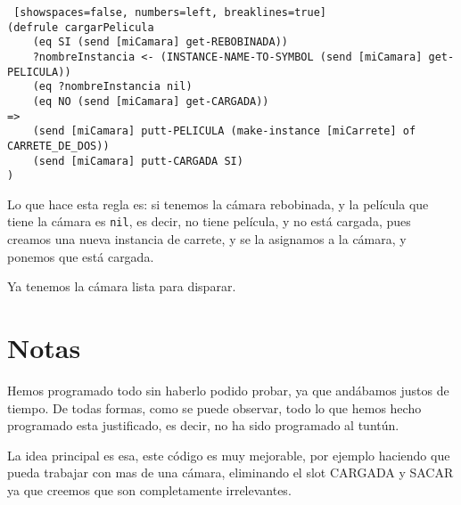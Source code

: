 \documentclass[hidelinks]{scrreprt}
\begin{document}
\begin{lstlisting} [showspaces=false, numbers=left, breaklines=true]
(defrule cargarPelicula
    (eq SI (send [miCamara] get-REBOBINADA))
    ?nombreInstancia <- (INSTANCE-NAME-TO-SYMBOL (send [miCamara] get-PELICULA))
    (eq ?nombreInstancia nil)
    (eq NO (send [miCamara] get-CARGADA))
=>
    (send [miCamara] putt-PELICULA (make-instance [miCarrete] of CARRETE_DE_DOS))
    (send [miCamara] putt-CARGADA SI)
)
\end{lstlisting}

Lo que hace esta regla es: si tenemos la c\'{a}mara rebobinada, y la pel\'{i}cula que tiene
la c\'{a}mara es \texttt{nil}, es decir, no tiene pel\'{i}cula, y no est\'{a} cargada, pues creamos
una nueva instancia de carrete, y se la asignamos a la c\'{a}mara, y ponemos que est\'{a} cargada.

Ya tenemos la c\'{a}mara lista para disparar.

\appendix
\chapter{Notas}
Hemos programado todo sin haberlo podido probar, ya que and\'{a}bamos justos de tiempo. De todas formas, como
se puede observar, todo lo que hemos hecho programado esta justificado, es decir, no ha sido programado al tunt\'{u}n.

La idea principal es esa, este c\'{o}digo es muy mejorable, por ejemplo haciendo que pueda trabajar con mas de una 
c\'{a}mara, eliminando el slot CARGADA y SACAR ya que creemos que son completamente irrelevantes.
\end{document}
